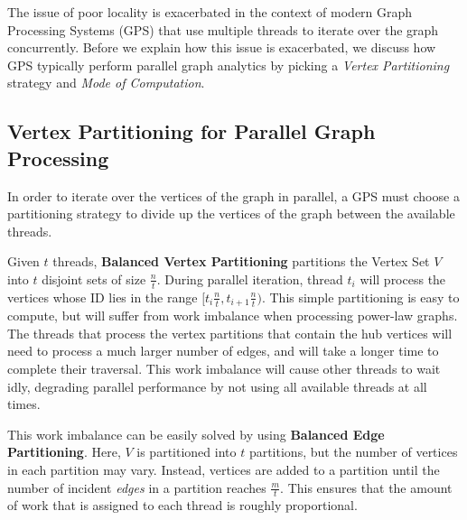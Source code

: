 The issue of poor locality is exacerbated in the context of modern Graph Processing Systems (\ac{GPS}) that use multiple threads to iterate over the graph concurrently. 
Before we explain how this issue is exacerbated, we discuss how \ac{GPS} typically perform parallel graph analytics by picking a \textit{Vertex Partitioning} strategy and \textit{Mode of Computation}. 

%


\subsection{Vertex Partitioning for Parallel Graph Processing}

In order to iterate over the vertices of the graph in parallel, a \ac{GPS} must choose a partitioning strategy to divide up the vertices of the graph between the available threads. 

Given $t$ threads, \textbf{Balanced Vertex Partitioning} partitions the Vertex Set $V$ into $t$ disjoint sets of size $\frac{n}{t}$. During parallel iteration, thread $t_i$ will process the vertices whose ID lies in the range
$[t_i \frac{n}{t},t_{i+1} \frac{n}{t})$. This simple partitioning is easy to compute, but will suffer from work imbalance when processing power-law graphs. The threads that process the vertex partitions that contain the hub vertices will need to process a much larger number of edges, and will take a longer time to complete their traversal. This work imbalance will cause other threads to wait idly, degrading parallel performance by not using all available threads at all times.

This work imbalance can be easily solved by using \textbf{Balanced Edge Partitioning}. Here, $V$ is partitioned into $t$ partitions, but the number of vertices in each partition may vary. Instead, vertices are added to a partition until the number of incident \textit{edges} in a partition reaches $\frac{m}{t}$. This ensures that the amount of work that is assigned to each thread is roughly proportional. 

